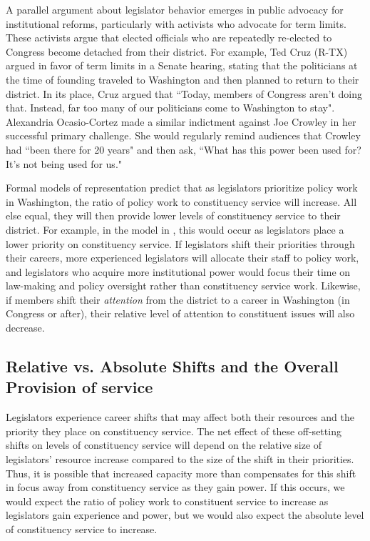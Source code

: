 \documentclass[12pt]{article}
\begin{document}
A parallel argument about legislator behavior emerges in public advocacy for institutional reforms, particularly with activists who advocate for term limits. These activists argue that elected officials who are repeatedly re-elected to Congress become detached from their district. For example, Ted Cruz (R-TX) argued in favor of term limits in a Senate hearing, stating that the politicians at the time of founding traveled to Washington and then planned to return to their district. In its place, Cruz argued that ``Today, members of Congress aren't doing that. Instead, far too many of our politicians come to Washington to stay". Alexandria Ocasio-Cortez made a similar indictment against Joe Crowley in her successful primary challenge. She would regularly remind audiences that Crowley had ``been there for 20 years" and then ask, ``What has this power been used for? It's not being used for us." %

Formal models of representation predict that as legislators prioritize policy work in Washington, the ratio of policy work to constituency service will increase. All else equal, they will then provide lower levels of constituency service to their district. For example, in the model in \cite{AshworthBuenodeMesquita2006}, this would occur as legislators place a lower priority on constituency service. If legislators shift their priorities through their careers, more experienced legislators will allocate their staff to policy work, and legislators who acquire more institutional power would focus their time on law-making and policy oversight rather than constituency service work. Likewise, if members shift their \textit{attention} from the district to a career in Washington (in Congress or after), their relative level of attention to constituent issues will also decrease. 


\subsection{Relative vs. Absolute Shifts and the Overall Provision of service} 
Legislators experience career shifts that may affect both their resources and the priority they place on constituency service. The net effect of these off-setting shifts on levels of constituency service will depend on the relative size of legislators' resource increase compared to the size of the shift in their priorities. Thus, it is possible that increased capacity more than compensates for this shift in focus away from constituency service as they gain power. If this occurs, we would expect the ratio of policy work to constituent service to increase as legislators gain experience and power, but we would also expect the absolute level of constituency service to increase.
\end{document}
